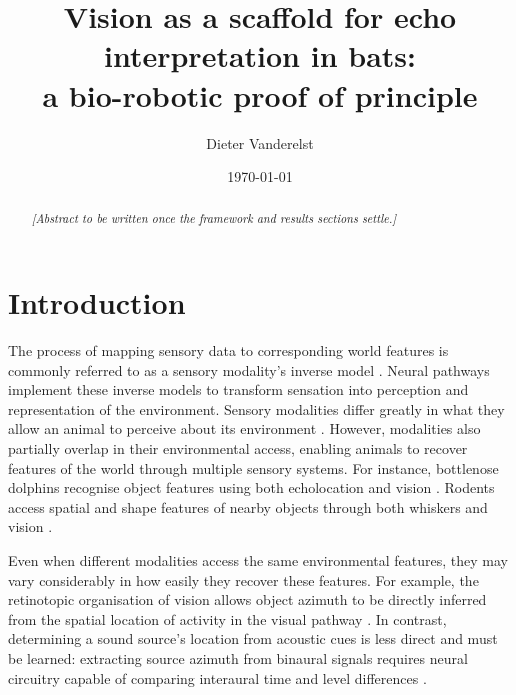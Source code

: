 \documentclass[11pt]{article}
\title{Vision as a scaffold for echo interpretation in bats:\\a bio-robotic proof of principle}
\author{Dieter Vanderelst}
\date{\today}
\begin{document}
\maketitle

\begin{abstract}
\noindent\textit{[Abstract to be written once the framework and results sections settle.]}
\end{abstract}

\section{Introduction}
The process of mapping sensory data to corresponding world features is commonly referred to as a sensory modality's inverse model \citep{Jordan1992,Wolpert1998,Sutton1990,Ha2018, Rao1999,Friston2010}. Neural pathways implement these inverse models to transform sensation into perception and representation of the environment. Sensory modalities differ greatly in what they allow an animal to perceive about its environment \citep[e.g.,][]{Boonman2013,Page2021}. However, modalities also partially overlap in their environmental access, enabling animals to recover features of the world through multiple sensory systems. For instance, bottlenose dolphins recognise object features using both echolocation and vision \citep{Herman1998,Harley2003,Bruck2022}. Rodents access spatial and shape features of nearby objects through both whiskers and vision \citep{Winters2010,Nikbakht2018,Guyoton2025}.

Even when different modalities access the same environmental features, they may vary considerably in how easily they recover these features. For example, the retinotopic organisation of vision allows object azimuth to be directly inferred from the spatial location of activity in the visual pathway \citep{Wandell2007,Szeliski2022}. In contrast, determining a sound source's location from acoustic cues is less direct and must be learned: extracting source azimuth from binaural signals requires neural circuitry capable of comparing interaural time and level differences \citep{Grothe2003,Hofman1998}.
\end{document}
